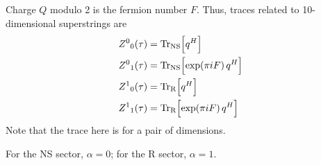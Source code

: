 	
	Charge $Q$ modulo 2 is the fermion number $F$. Thus, traces related to 10-dimensional superstrings are
	\begin{subequations}
		\begin{align}
			Z^{0}{}_{0}(\tau) &= \operatorname{Tr}_{\text{NS}} \Bigl[ q^{H}\Bigr] \label{10.7.8a} \\
			Z^{0}{}_{1}(\tau) &= \operatorname{Tr}_{\text{NS}} \Bigl[ \exp(\pi i F)\, q^{H}\Bigr] \label{10.7.8b} \\
			Z^{1}{}_{0}(\tau) &= \operatorname{Tr}_{\text{R}} \Bigl[ q^{H}\Bigr] \label{10.7.8c} \\
			Z^{1}{}_{1}(\tau) &= \operatorname{Tr}_{\text{R}} \Bigl[ \exp(\pi i F)\, q^{H}\Bigr] \label{10.7.8d}
		\end{align} \label{10.7.8}
	\end{subequations}
	Note that the trace here is for a pair of dimensions.
	\begin{tcolorbox}[breakable]
		\noindent For the NS sector, $\alpha=0$; for the R sector, $\alpha=1$.
	\end{tcolorbox}
	
